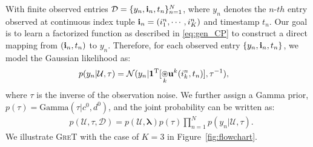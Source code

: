 With finite observed entries $\mathcal{D}=\{y_n, \mathbf{i}_n, t_n\}_{n=1}^{N}$, where $y_{n}$ denotes the $n$-$th$ entry observed at continuous index tuple $\mathbf{i}_n = (i_1^n, \cdots, i_K^n)$ and timestamp $t_n$. Our goal is to learn a factorized function as described in \eqref{eq:gen_CP}  to construct a direct mapping from $(\mathbf{i}_n, t_n)$ to $y_{n}$. 
Therefore, for each observed entry $\{y_n, \mathbf{i}_n, t_n\}$, we model the Gaussian likelihood  as:
\vspace{-1mm}
\begin{equation}
\begin{split}
        p(y_{n}&|\mathcal{U},\tau)=\mathcal{N}(y_{n}|\boldsymbol{1}^{\mathrm{T}}[\underset{k}{\circledast} 
 \mathbf{u}^k(i_k^n,t_n)], \tau^{-1}),
        \label{eq:likelihood}
\end{split}
\end{equation}
where  $\tau$ is the inverse of the observation noise. We further assign a Gamma prior, $p(\tau) = \text{Gamma}(\tau|c^0, d^0)$, and the joint probability can be written as:
\vspace{-2mm}
\begin{equation}
\begin{split}
        &p(\mathcal{U}, \tau, \mathcal{D}) =p(\mathcal{U}, \boldsymbol{\lambda})p(\tau) \prod_{n=1}^{N}p(y_{n}|\mathcal{U}, \tau).
\end{split}
    \label{eq:joint}
\end{equation}
We illustrate \textsc{GreT} with the case of $K=3$ in Figure~\ref{fig:flowchart}.